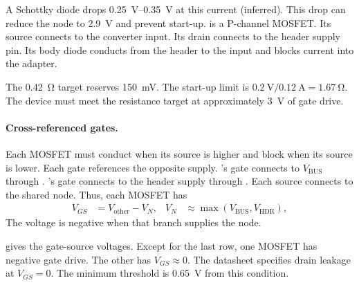 A Schottky diode drops \SIrange{0.25}{0.35}{\volt} at this current (inferred).
This drop can reduce the node to \SI{2.9}{\volt} and prevent start-up.
 is a P-channel MOSFET. Its source connects to the converter
input. Its drain connects to the header supply pin. Its body diode conducts
from the header to the input and blocks current into the adapter.

The \SI{0.42}{\ohm} target reserves \SI{150}{\milli\volt}. The start-up limit
is $\SI{0.2}{\volt}/\SI{0.12}{\ampere}=\SI{1.67}{\ohm}$. The device must meet
the resistance target at approximately \SI{3}{\volt} of gate drive.

\paragraph{Cross-referenced gates.} Each MOSFET must conduct when its source is
higher and block when its source is lower. Each gate references the opposite
supply. 's gate connects to $V_{\mathrm{BUS}}$ through
. 's gate connects to the header supply through
. Each source connects to the shared node. Thus, each MOSFET has
\begin{align*}
  V_{GS} &= V_{\mathrm{other}} - V_N, & V_N &\approx \max(V_{\mathrm{BUS}},
    V_{\mathrm{HDR}}),
\end{align*}
The voltage is negative when that branch supplies the node.

 gives the gate-source voltages. Except for the last row,
one MOSFET has negative gate drive. The other has $V_{GS}\approx0$. The
datasheet specifies drain leakage at $V_{GS}=0$. The minimum threshold is
\SI{0.65}{\volt} from this condition.

